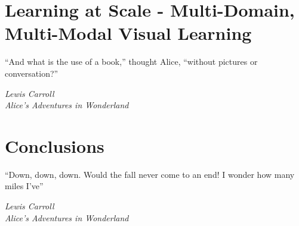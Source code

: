 \documentclass[phd,tocprelim]{cornell}
\begin{document}
\chapter{Learning at Scale - Multi-Domain, Multi-Modal Visual Learning}
\epigraph{``And what is the use of a book,'' thought Alice, ``without pictures or conversation?''}{\textit{Lewis Carroll\\ Alice's Adventures in Wonderland}}



\chapter{Conclusions}
\epigraph{``Down, down, down. Would the fall never come to an end! I wonder how many miles I've''}{\textit{Lewis Carroll\\ Alice's Adventures in Wonderland}}


\appendix



\end{document}
